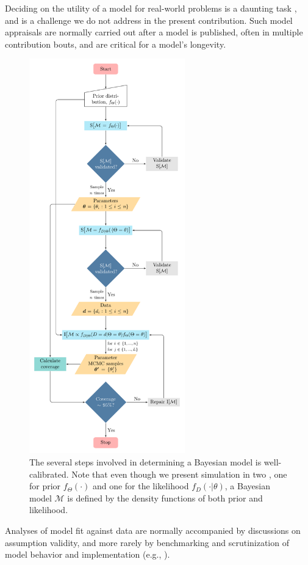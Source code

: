 \documentclass[oneside]{article}
\begin{document}
Deciding on the utility of a model for real-world problems is a
daunting task \citep{brown18,shepherd18}, and is a challenge we do not address in
the present contribution.
Such model appraisals are normally carried out after a model is
published, often in multiple contribution bouts, and are critical for a model's
longevity.
\begin{figure}
  \includegraphics[width=6.75cm]{../figures/flowchart.pdf}
  \caption{The several steps involved in determining a Bayesian model is
    well-calibrated. Note that even though we present simulation in two
    , one for prior $f_\Theta(\cdot)$ and one for the likelihood
    $f_D(\cdot|\theta)$, a Bayesian model $\mathcal{M}$ is 
    defined by the density functions of both prior and likelihood.}
    \label{fig:flowchart}
\end{figure}
Analyses of model fit against data are normally accompanied by discussions on
assumption validity, and more rarely by benchmarking and scrutinization of model
behavior and implementation (e.g., \citealp{maddison07,rabosky15,rabosky13,moore16,stadler10,luo20}).
\end{document}
